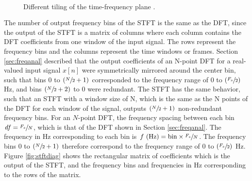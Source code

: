 \documentclass[report.tex]{subfiles}
\begin{document}
\begin{figure}[ht]
	\centering
	\\
	\caption{Different tiling of the time-frequency plane \parencite[326, 327]{gabordiagrams}.}
	\label{fig:gabortf}
\end{figure}

The number of output frequency bins of the STFT is the same as the DFT, since the output of the STFT is a matrix of columns where each column contains the DFT coefficients from one window of the input signal. The rows represent the frequency bins and the columns represent the time windows or frames. Section \ref{sec:freqanal} described that the output coefficients of an N-point DFT for a real-valued input signal $x[n]$ were symmetrically mirrored around the center bin, such that bins 0 to $(\sfrac{N}{2}+1)$ corresponded to the frequency range of 0 to $(\sfrac{F_{s}}{2})$ Hz, and bins $(\sfrac{N}{2}+2)$ to 0 were redundant. The STFT has the same behavior, such that an STFT with a window size of N, which is the same as the N points of the DFT for each window of the signal, outputs $(\sfrac{N}{2}+1)$ non-redundant frequency bins. For an $N$-point DFT, the frequency spacing between each bin $\mathit{df} = \sfrac{F_{s}}{N}$, which is that of the DFT shown in Section \ref{sec:freqanal}. The frequency in Hz corresponding to each bin is $f \text{ (Hz)} = \text{bin}\times\sfrac{F_{s}}{N}$. The frequency bins 0 to $(\sfrac{N}{2}+1)$ therefore correspond to the frequency range of 0 to $(\sfrac{F_{s}}{2})$ Hz. Figure \ref{fig:stftdiag} shows the rectangular matrix of coefficients which is the output of the STFT, and the frequency bins and frequencies in Hz corresponding to the rows of the matrix.
\end{document}
